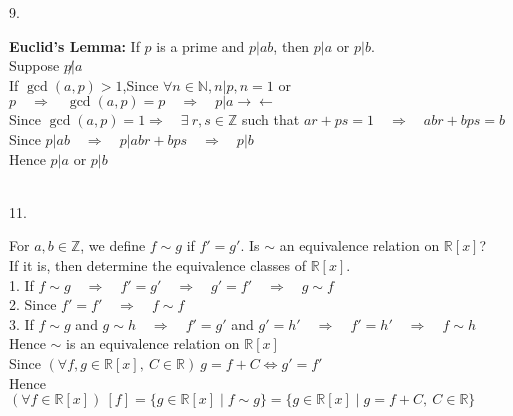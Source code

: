 \documentclass[12pt]{book}
\begin{document}
\begin{CJK}{UTF8}{bsmi}
9. \begin{minipage}[t]{\dimexpr\linewidth-2em}
{\bf Euclid's Lemma:} If $p$ is a prime and $p|ab$, then $p|a$ or $p|b$. \\
Suppose $p\not|a$ \\
If $\gcd(a,p)>1$,\quad Since $\forall n\in\mathbb{N}, n|p, n=1$ or $p\quad\Rightarrow\quad\gcd(a,p)=p\quad\Rightarrow\quad p|a\rightarrow\leftarrow$ \\
Since $\gcd(a,p)=1\Rightarrow\quad\exists\ r, s\in\mathbb{Z}$ such that $ar+ps=1\quad\Rightarrow\quad abr+bps=b$ \\
Since $p|ab\quad\Rightarrow\quad p|abr+bps\quad\Rightarrow\quad p|b$ \\
Hence $p|a$ or $p|b$
\end{minipage}\\

11. \begin{minipage}[t]{\dimexpr\linewidth-2em}
For $a, b \in\mathbb{Z}$, we define $f\sim g$ if $f'=g'$. Is $\sim$ an equivalence relation on $\mathbb{R}[x]$? \\
If it is, then determine the equivalence classes of $\mathbb{R}[x]$. \\
1. If $f\sim g\quad\Rightarrow\quad f'=g'\quad\Rightarrow\quad g'=f'\quad\Rightarrow\quad g\sim f$ \\
2. Since $f'=f'\quad\Rightarrow\quad f\sim f$ \\
3. If $f\sim g$ and $g\sim h\quad\Rightarrow\quad f'=g'$ and $g'=h'\quad\Rightarrow\quad f'=h'\quad\Rightarrow\quad f\sim h$ \\
Hence $\sim$ is an equivalence relation on $\mathbb{R}[x]$ \\
Since $(\forall f,g\in\mathbb{R}[x],\ C\in\mathbb{R})\  g=f+C\Leftrightarrow g'=f'$ \\
Hence $(\forall f\in\mathbb{R}[x])\ [f]=\{g\in\mathbb{R}[x]\mid f\sim g\}=\{g\in\mathbb{R}[x]\mid g=f+C,\ C\in\mathbb{R}\}$
\end{minipage}\\


\end{CJK}
\end{document}
